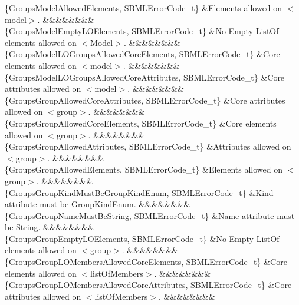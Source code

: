 \begin{DoxyParagraph}{}
\begin{longtabu}
\{Groups\+Model\+Allowed\+Elements, S\+B\+M\+L\+Error\+Code\+\_\+t\} &Elements allowed on {\ttfamily $<$model$>$}. &&&&&&&&\\
\{Groups\+Model\+Empty\+L\+O\+Elements, S\+B\+M\+L\+Error\+Code\+\_\+t\} &No Empty \hyperlink{class_list_of}{List\+Of} elements allowed on {\ttfamily $<$\hyperlink{class_model}{Model}$>$}. &&&&&&&&\\
\{Groups\+Model\+L\+O\+Groups\+Allowed\+Core\+Elements, S\+B\+M\+L\+Error\+Code\+\_\+t\} &Core elements allowed on {\ttfamily $<$model$>$}. &&&&&&&&\\
\{Groups\+Model\+L\+O\+Groups\+Allowed\+Core\+Attributes, S\+B\+M\+L\+Error\+Code\+\_\+t\} &Core attributes allowed on {\ttfamily $<$model$>$}. &&&&&&&&\\
\{Groups\+Group\+Allowed\+Core\+Attributes, S\+B\+M\+L\+Error\+Code\+\_\+t\} &Core attributes allowed on {\ttfamily $<$group$>$}. &&&&&&&&\\
\{Groups\+Group\+Allowed\+Core\+Elements, S\+B\+M\+L\+Error\+Code\+\_\+t\} &Core elements allowed on {\ttfamily $<$group$>$}. &&&&&&&&\\
\{Groups\+Group\+Allowed\+Attributes, S\+B\+M\+L\+Error\+Code\+\_\+t\} &Attributes allowed on {\ttfamily $<$group$>$}. &&&&&&&&\\
\{Groups\+Group\+Allowed\+Elements, S\+B\+M\+L\+Error\+Code\+\_\+t\} &Elements allowed on {\ttfamily $<$group$>$}. &&&&&&&&\\
\{Groups\+Group\+Kind\+Must\+Be\+Group\+Kind\+Enum, S\+B\+M\+L\+Error\+Code\+\_\+t\} &Kind attribute must be Group\+Kind\+Enum. &&&&&&&&\\
\{Groups\+Group\+Name\+Must\+Be\+String, S\+B\+M\+L\+Error\+Code\+\_\+t\} &Name attribute must be String. &&&&&&&&\\
\{Groups\+Group\+Empty\+L\+O\+Elements, S\+B\+M\+L\+Error\+Code\+\_\+t\} &No Empty \hyperlink{class_list_of}{List\+Of} elements allowed on {\ttfamily $<$group$>$}. &&&&&&&&\\
\{Groups\+Group\+L\+O\+Members\+Allowed\+Core\+Elements, S\+B\+M\+L\+Error\+Code\+\_\+t\} &Core elements allowed on {\ttfamily $<$list\+Of\+Members$>$}. &&&&&&&&\\
\{Groups\+Group\+L\+O\+Members\+Allowed\+Core\+Attributes, S\+B\+M\+L\+Error\+Code\+\_\+t\} &Core attributes allowed on {\ttfamily $<$list\+Of\+Members$>$}. &&&&&&&&\\

\end{longtabu}
\end{DoxyParagraph}
